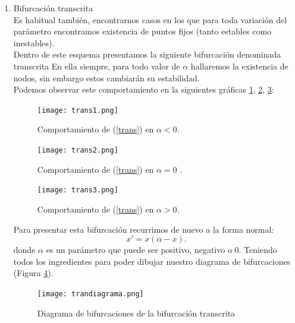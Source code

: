 \begin{enumerate}
\begin{proof}
	
\end{proof}


Equivalentemente podemos tratar el caso 
\begin{equation}
x'=\alpha-x^2.
\end{equation}
cuyo comportamiento es similar respecto de la variación entre $[-\infty,+\infty]$ de $\alpha$, siendo simétrico en cuanto a esquema pero permutándose las ramas estables e inestables.

Es habitual que en la clasificación de bifurcaciones no haya un consenso generalizado sobre el nombre de las mismas. Para evitar confusiones he de resaltar que esta bifurcación también recibe el nombre de bifurcación de doblez (fold bifurcation) o de punto giratorio (turning point bifurcation)


\item Bifurcación transcrita\\
Es habitual también, encontrarnos casos en los que para toda variación del parámetro encontramos existencia de puntos fijos (tanto estables como inestables). \\
Dentro de este esquema presentamos la siguiente bifurcación denominada transcrita En ella siempre, para todo valor de  $\alpha$ hallaremos la existencia  de nodos, sin embargo estos cambiarán su estabilidad.
\\
Podemos observar este comportamiento en la siguientes gráficas \ref{trans1}, \ref{trans2}, \ref{trans3}:
\begin{figure}[H]
	\centering
	\texttt{[image: trans1.png]}
	\caption{Comportamiento de (\ref{trans}) en $\alpha<0$.}
	\label{trans1}
\end{figure}
\begin{figure}[H]
	\centering
	\texttt{[image: trans2.png]}
	\caption{Comportamiento de (\ref{trans}) en $\alpha=0$ .}
	\label{trans2}
\end{figure}
\begin{figure}[H]
	\centering
	\texttt{[image: trans3.png]}
	\caption{Comportamiento de (\ref{trans}) en $\alpha>0$.}
	\label{trans3}
\end{figure}
Para presentar esta bifurcación recurrimos de nuevo a la forma normal:
\begin{equation}
x'=x(\alpha-x).
\label{trans}
\end{equation}
donde $\alpha$ es un parámetro que puede ser positivo, negativo o 0.
Teniendo todos los ingredientes para poder dibujar nuestro diagrama de bifurcaciones (Figura \ref{trandia}).
\begin{figure}[H]
	\centering
	\texttt{[image: trandiagrama.png]}
	\caption{Diagrama de bifurcaciones de la bifurcación transcrita}
	\label{trandia}
\end{figure}


\end{enumerate}
